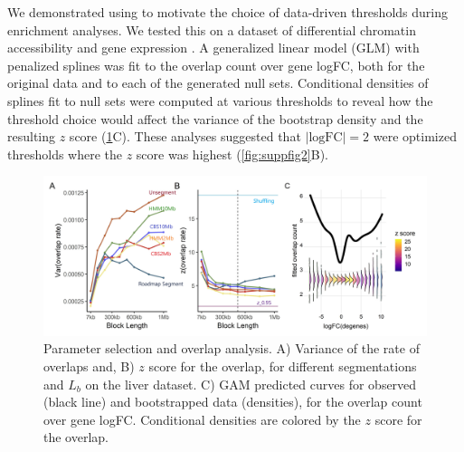 We demonstrated using \bootranges to motivate the choice of data-driven thresholds 
during enrichment analyses. We tested this on a dataset of differential chromatin accessibility and gene expression 
\citep{alasoo2018shared,lee2020fluent}.
A generalized linear model (GLM) with penalized splines was
fit to the overlap count over gene logFC, both for the original
data and to each of the generated null sets.
Conditional densities of splines fit to null sets
were computed at various thresholds to reveal how
the threshold choice would affect the
variance of the bootstrap density and the resulting $z$ score
(\cref{fig:result}C).
These analyses suggested that $|\textrm{logFC}| = 2$
were optimized thresholds where the $z$ score was highest
(\cref{fig:suppfig2}B).

\begin{figure}[htbp]
\centering%
\includegraphics[scale=0.09]{Figures/fig2_3.jpeg}
\caption{
  Parameter selection and overlap analysis.
  A) Variance of the rate of overlaps and,
  B) $z$ score for the overlap,
  for different segmentations and $L_b$ on the liver 
  dataset.
  C) GAM predicted curves for observed (black line) and
  bootstrapped data (densities),
  for the overlap count over gene logFC.
  Conditional densities are colored by the $z$ score for the overlap.
}
\label{fig:result}
\end{figure}


